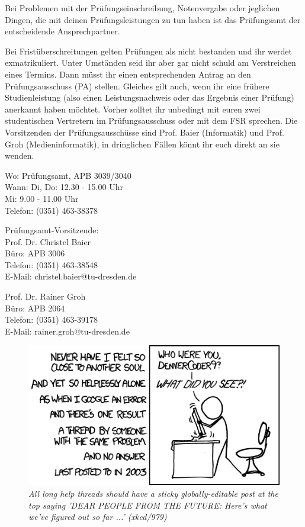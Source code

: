 Bei Problemen mit der Prüfungseinschreibung, Notenvergabe oder jeglichen Dingen, die mit deinen Prüfungsleistungen zu tun haben ist das Prüfungsamt der entscheidende Ansprechpartner.

Bei Fristüberschreitungen gelten Prüfungen als nicht bestanden und ihr werdet exmatrikuliert.
Unter Umständen seid ihr aber gar nicht schuld am Verstreichen eines Termins.
Dann müsst ihr einen entsprechenden Antrag an den Prüfungsausschuss (PA) stellen.
Gleiches gilt auch, wenn ihr eine frühere Studienleistung (also einen Leistungsnachweis oder das Ergebnis einer Prüfung) anerkannt haben möchtet.
Vorher solltet ihr unbedingt mit euren zwei studentischen Vertretern im Prüfungsausschuss oder mit dem FSR sprechen.
Die Vorsitzenden der Prüfungsausschüsse sind Prof. Baier (Informatik) und Prof. Groh (Medieninformatik), in dringlichen Fällen könnt ihr euch direkt an sie wenden.

Wo: Prüfungsamt, APB 3039/3040 \\
Wann: Di, Do: 12.30 - 15.00 Uhr \\
Mi: 9.00 - 11.00 Uhr \\
Telefon: (0351) 463-38378

Prüfungsamt-Vorsitzende: \\
Prof. Dr. Christel Baier \\
Büro: APB 3006 \\
Telefon: (0351) 463-38548 \\
E-Mail: christel.baier@tu-dresden.de

Prof. Dr. Rainer Groh \\
Büro: APB 2064 \\
Telefon: (0351) 463-39178 \\
E-Mail: rainer.groh@tu-dresden.de

\begin{figure}[h!]
\centering \includegraphics[width=\linewidth]{img/xkcd/wisdom_of_the_ancients.png}
\caption*{{\small \textit{All long help threads should have a sticky globally-editable post at the top saying 'DEAR PEOPLE FROM THE FUTURE: Here's what we've figured out so far ...' (xkcd/979)}}}
\end{figure}
